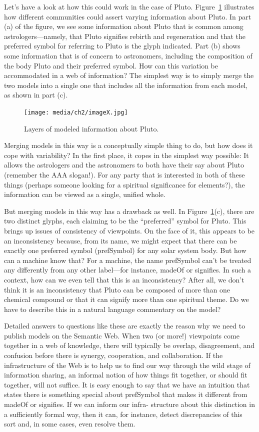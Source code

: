 Let's have a look at how this could work in the case of Pluto. Figure~\ref{fig:ch2.3} 
illustrates how different communities could assert varying
information about Pluto. In part (a) of the figure, we see some
information about Pluto that is common among astrologers---namely, that
Pluto signifies rebirth and regeneration and that the preferred symbol
for referring to Pluto is the glyph indicated. Part (b) shows some
information that is of concern to astronomers, including the composition
of the body Pluto and their preferred symbol. How can this variation be
accommodated in a web of information? The simplest way is to simply
merge the two models into a single one that includes all the information
from each model, as shown in part (c).

\begin{figure}
    \centering
    \texttt{[image: media/ch2/imageX.jpg]}
    \caption{Layers of modeled information about Pluto.}
    \label{fig:ch2.3}
\end{figure}

Merging models in this way is a conceptually simple thing to do, but how
does it cope with variability? In the first place, it copes in the
simplest way possible: It allows the astrologers and the astronomers to
both have their say about Pluto (remember the AAA slogan!). For any
party that is interested in both of these things (perhaps someone
looking for a spiritual significance for elements?), the information can
be viewed as a single, unified whole.

But merging models in this way has a drawback as well. In Figure~\ref{fig:ch2.3}(c),
there are two distinct glyphs, each claiming to be the ``preferred''
symbol for Pluto. This brings up issues of consistency of viewpoints. On
the face of it, this appears to be an inconsistency because, from its
name, we might expect that there can be exactly one preferred symbol
(prefSymbol) for any solar system body. But how can a machine know that?
For a machine, the name prefSymbol can't be treated any differently from
any other label---for instance, madeOf or signifies. In such a context,
how can we even tell that this is an inconsistency? After all, we don't
think it is an inconsistency that Pluto can be composed of more than one
chemical compound or that it can signify more than one spiritual theme.
Do we have to describe this in a natural language commentary on the
model?

Detailed answers to questions like these are exactly the reason why we
need to publish models on the Semantic Web. When two (or more!)
viewpoints come together in a web of knowledge, there will typically be
overlap, disagreement, and confusion before there is synergy,
cooperation, and collaboration. If the infrastructure of the Web is to
help us to find our way through the wild stage of information sharing,
an informal notion of how things fit together, or should fit together,
will not suffice. It is easy enough to say that we have an intuition
that states there is something special about prefSymbol that makes it
different from madeOf or signifies. If we can inform our infra-
structure about this distinction in a sufficiently formal way, then it
can, for instance, detect discrepancies of this sort and, in some cases,
even resolve them.

